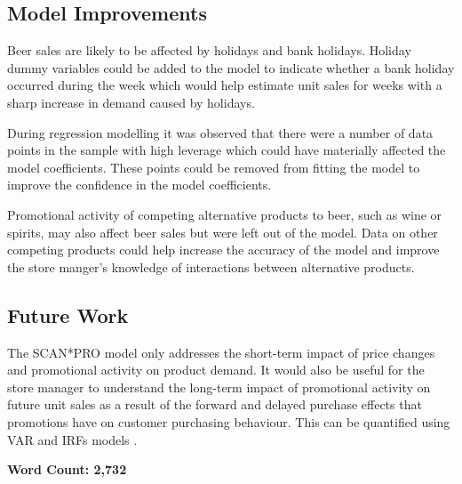 \documentclass[a4paper,11pt]{article}
\begin{document}
\subsection{Model Improvements}
Beer sales are likely to be affected by holidays and bank holidays. Holiday dummy variables could be added to the model to indicate whether a bank holiday occurred during the week which would help estimate unit sales for weeks with a sharp increase in demand caused by holidays.

During regression modelling it was observed that there were a number of data points in the sample with high leverage which could have materially affected the model coefficients. These points could be removed from fitting the model to improve the confidence in the model coefficients. 

Promotional activity of competing alternative products to beer, such as wine or spirits, may also affect beer sales but were left out of the model. Data on other competing products could help increase the accuracy of the model and improve the store manger's knowledge of interactions between alternative products.

\subsection{Future Work}
The SCAN*PRO model only addresses the short-term impact of price changes and promotional activity on product demand. It would also be useful for the store manager to understand the long-term impact of promotional activity on future unit sales as a result of the forward and delayed purchase effects that promotions have on customer purchasing behaviour. This can be quantified using VAR and IRFs models \citep{srinivasan_promotions_2004}.  


\textbf{Word Count: 2,732}



\end{document}
